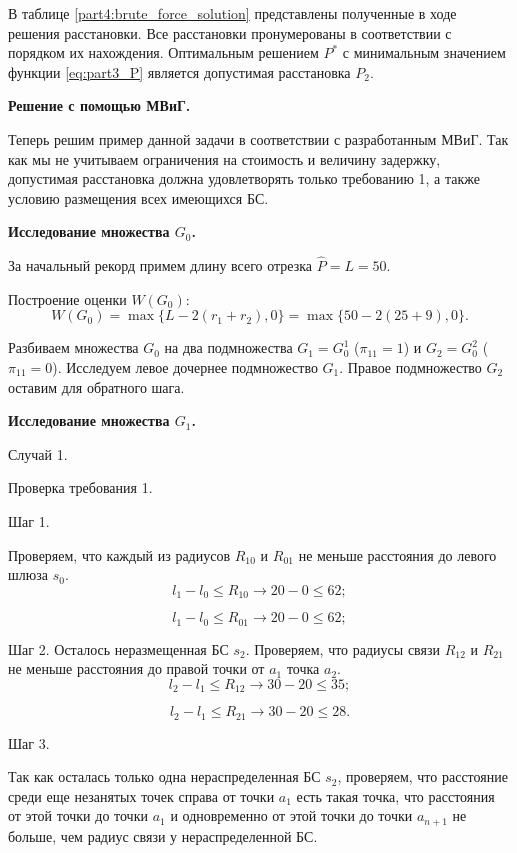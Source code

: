 В таблице \cref{part4:brute_force_solution} представлены полученные в ходе решения расстановки. Все расстановки пронумерованы в соответствии с порядком их нахождения. Оптимальным решением $P^*$ с минимальным значением функции \cref{eq:part3_P} является допустимая расстановка $P_2$.


\textbf{Решение с помощью МВиГ.}

Теперь решим пример данной задачи в соответствии с разработанным МВиГ. Так как мы не учитываем ограничения на стоимость и величину задержку, допустимая расстановка должна удовлетворять только требованию 1, а также условию размещения всех имеющихся БС.



\textbf{Исследование множества $G_0$.}

За начальный рекорд примем длину всего отрезка $\widehat{P} = L = 50$.

Построение оценки $W(G_0)$:
$$
W(G_0)= \max\{L-2(r_1 + r_2), 0\} = \max\{50 -2(25+9), 0 \}.
$$

Разбиваем множества $G_0$ на два подмножества $G_1 = G^1_0$ ($\pi_{11} = 1$) и $G_2 = G^2_0$ ($\pi_{11} = 0$). Исследуем левое дочернее подмножество $G_1$. Правое подмножество $G_2$ оставим для обратного шага.

\textbf{Исследование множества $G_1$.}

Случай 1.

Проверка требования 1.

Шаг 1.

Проверяем, что каждый из радиусов $R_{10}$ и $R_{01}$ не меньше расстояния  до левого шлюза $s_0$. 
$$
l_1 - l_0 \leqslant R_{10} \rightarrow 20 - 0 \leqslant 62;
$$

$$
l_1 - l_0 \leqslant R_{01} \rightarrow 20 - 0 \leqslant 62;
$$

Шаг 2.
Осталось неразмещенная БС $s_2$. Проверяем, что радиусы связи $R_{12}$ и $R_{21}$ не меньше расстояния до правой точки от $a_1$ точка $a_2$.
$$
l_2 - l_1 \leqslant R_{12} \rightarrow 30 - 20 \leqslant 35;
$$

$$
l_2 - l_1 \leqslant R_{21} \rightarrow 30 - 20 \leqslant 28.
$$

Шаг 3.

Так как осталась только одна нераспределенная БС $s_2$, проверяем, что расстояние среди еще незанятых точек справа от точки $a_1$  есть такая точка, что расстояния от этой точки до точки $a_1$ и одновременно от этой точки до точки $a_{n+1}$ не больше, чем  радиус связи у нераспределенной БС.


